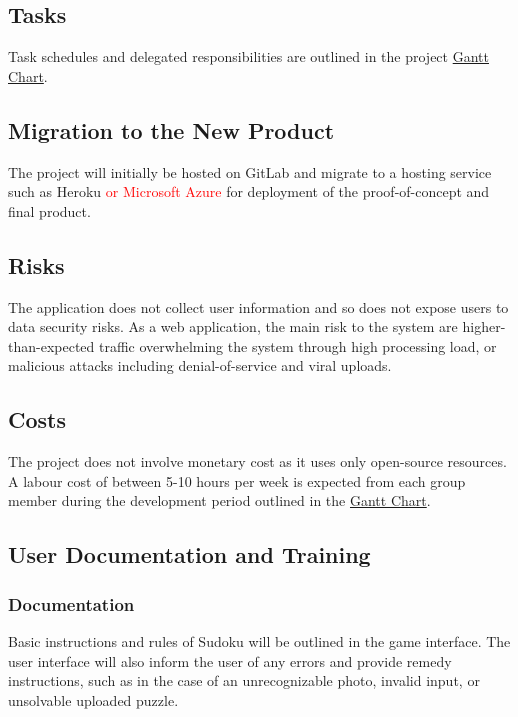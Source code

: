 \documentclass[11pt]{article}
\begin{document}
\subsection{Tasks}
Task schedules and delegated responsibilities are outlined in the project \href{https://gitlab.cas.mcmaster.ca/bhuiyr2/sudokusolver_l02_grp08/-/blob/main/ProjectSchedule/Gantt_Sudoku.pdf}{Gantt Chart}.

\subsection{Migration to the New Product}
The project will initially be hosted on GitLab and migrate to a hosting service such as Heroku \textcolor{red}{or Microsoft Azure} for deployment of the proof-of-concept and final product.

\subsection{Risks}
The application does not collect user information and so does not expose users to data security risks. As a web application, the main risk to the system are higher-than-expected traffic overwhelming the system through high processing load, or malicious attacks including denial-of-service and viral uploads.

\subsection{Costs}
The project does not involve monetary cost as it uses only open-source resources. A labour cost of between 5-10 hours per week is expected from each group member during the development period outlined in the \href{https://gitlab.cas.mcmaster.ca/bhuiyr2/sudokusolver_l02_grp08/-/blob/main/ProjectSchedule/Gantt_Sudoku.pdf}{Gantt Chart}.

\subsection{User Documentation and Training}
\subsubsection{Documentation}
Basic instructions and rules of Sudoku will be outlined in the game interface. The user interface will also inform the user of any errors and provide remedy instructions, such as in the case of an unrecognizable photo, invalid input, or unsolvable uploaded puzzle.
\end{document}
